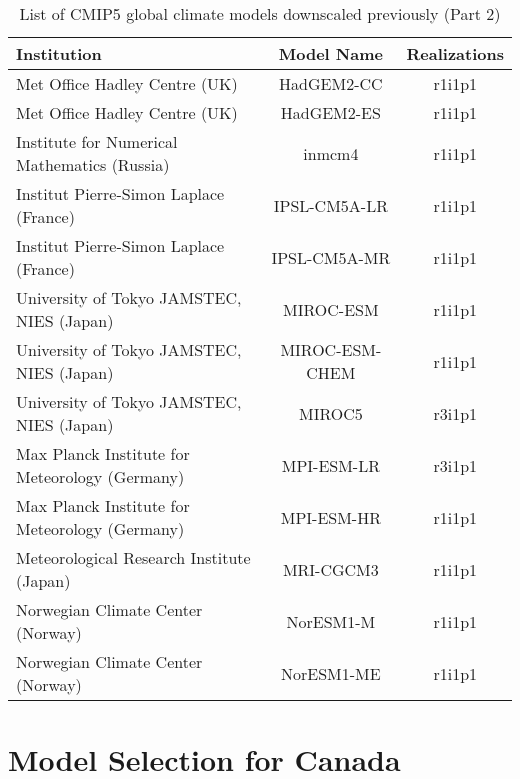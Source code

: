 \documentclass[]{scrartcl}
\begin{document}
\begin{appendices}
\begin{table}[t]
	\caption{List of CMIP5 global climate models downscaled previously (Part 2)}\label{table:gcm4}
	\begin{center}
		\begin{tabularx}{\linewidth}{|L|cc|} 
			\hline
			\textbf{Institution} & \textbf{Model Name} & \textbf{Realizations}  \\
			\hline					
			Met Office Hadley Centre (UK) & HadGEM2-CC & r1i1p1 \\
			Met Office Hadley Centre (UK) & HadGEM2-ES & r1i1p1 \\
			Institute for Numerical Mathematics (Russia) & inmcm4 & r1i1p1 \\
			Institut Pierre-Simon Laplace (France) & IPSL-CM5A-LR & r1i1p1 \\
			Institut Pierre-Simon Laplace (France) & IPSL-CM5A-MR & r1i1p1 \\
			University of Tokyo JAMSTEC, NIES (Japan) & MIROC-ESM & r1i1p1 \\
			University of Tokyo JAMSTEC, NIES (Japan) & MIROC-ESM-CHEM & r1i1p1 \\   
			University of Tokyo JAMSTEC, NIES (Japan) & MIROC5 & r3i1p1 \\   			
			Max Planck Institute for Meteorology (Germany) & MPI-ESM-LR & r3i1p1 \\
			Max Planck Institute for Meteorology (Germany) & MPI-ESM-HR & r1i1p1 \\   	
			Meteorological Research Institute (Japan) & MRI-CGCM3 & r1i1p1 \\
			Norwegian Climate Center (Norway) & NorESM1-M & r1i1p1 \\
			Norwegian Climate Center (Norway) & NorESM1-ME & r1i1p1 \\			
			\hline
		\end{tabularx}
	\end{center}
\end{table}

\clearpage

\section{Model Selection for Canada}\label{all_subsets}


\end{appendices}
\end{document}
